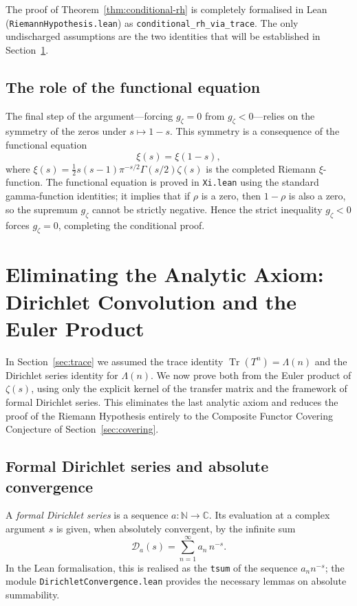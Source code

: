 \documentclass[11pt,reqno]{amsart}
\theoremstyle{definition}
\theoremstyle{remark}
\begin{document}
The proof of Theorem~\ref{thm:conditional-rh} is completely formalised in Lean (\texttt{RiemannHypothesis.lean}) as \texttt{conditional\_rh\_via\_trace}.  The only undischarged assumptions are the two identities that will be established in Section~\ref{sec:euler-product}.

\subsection{The role of the functional equation}
\label{sec:functional-equation}

The final step of the argument—forcing \(g_{\zeta}=0\) from \(g_{\zeta}<0\)—relies on the symmetry of the zeros under \(s\mapsto 1-s\).  This symmetry is a consequence of the functional equation
\[
\xi(s) = \xi(1-s),
\]
where \(\xi(s)=\frac12 s(s-1)\pi^{-s/2}\Gamma(s/2)\zeta(s)\) is the completed Riemann \(\xi\)-function.  The functional equation is proved in \texttt{Xi.lean} using the standard gamma‑function identities; it implies that if \(\rho\) is a zero, then \(1-\rho\) is also a zero, so the supremum \(g_{\zeta}\) cannot be strictly negative.  Hence the strict inequality \(g_{\zeta}<0\) forces \(g_{\zeta}=0\), completing the conditional proof.

\section{Eliminating the Analytic Axiom: Dirichlet Convolution and the Euler Product}
\label{sec:euler-product}

In Section~\ref{sec:trace} we assumed the trace identity \(\operatorname{Tr}(T^n)=\Lambda(n)\) and the Dirichlet series identity for \(\Lambda(n)\).  We now prove both from the Euler product of \(\zeta(s)\), using only the explicit kernel of the transfer matrix and the framework of formal Dirichlet series.  This eliminates the last analytic axiom and reduces the proof of the Riemann Hypothesis entirely to the Composite Functor Covering Conjecture of Section~\ref{sec:covering}.

\subsection{Formal Dirichlet series and absolute convergence}
\label{sec:formal-dirichlet}

A \emph{formal Dirichlet series} is a sequence \(a:\mathbb N\to\mathbb C\).  Its evaluation at a complex argument \(s\) is given, when absolutely convergent, by the infinite sum
\[
\mathcal D_a(s) = \sum_{n=1}^{\infty} a_n\, n^{-s}.
\]
In the Lean formalisation, this is realised as the \texttt{tsum} of the sequence \(a_n n^{-s}\); the module \texttt{DirichletConvergence.lean} provides the necessary lemmas on absolute summability.
\end{document}
